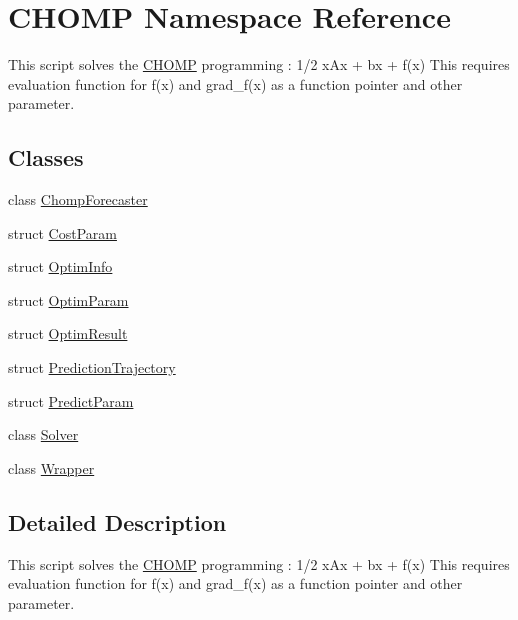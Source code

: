 \hypertarget{namespace_c_h_o_m_p}{}\section{C\+H\+O\+MP Namespace Reference}
\label{namespace_c_h_o_m_p}


This script solves the \hyperlink{namespace_c_h_o_m_p}{C\+H\+O\+MP} programming \+: 1/2 x\textquotesingle{}Ax + bx + f(x) This requires evaluation function for f(x) and grad\+\_\+f(x) as a function pointer and other parameter.  


\subsection*{Classes}
\begin{DoxyCompactItemize}
\item 
class \hyperlink{class_c_h_o_m_p_1_1_chomp_forecaster}{Chomp\+Forecaster}
\item 
struct \hyperlink{struct_c_h_o_m_p_1_1_cost_param}{Cost\+Param}
\item 
struct \hyperlink{struct_c_h_o_m_p_1_1_optim_info}{Optim\+Info}
\item 
struct \hyperlink{struct_c_h_o_m_p_1_1_optim_param}{Optim\+Param}
\item 
struct \hyperlink{struct_c_h_o_m_p_1_1_optim_result}{Optim\+Result}
\item 
struct \hyperlink{struct_c_h_o_m_p_1_1_prediction_trajectory}{Prediction\+Trajectory}
\item 
struct \hyperlink{struct_c_h_o_m_p_1_1_predict_param}{Predict\+Param}
\item 
class \hyperlink{class_c_h_o_m_p_1_1_solver}{Solver}
\item 
class \hyperlink{class_c_h_o_m_p_1_1_wrapper}{Wrapper}
\end{DoxyCompactItemize}


\subsection{Detailed Description}
This script solves the \hyperlink{namespace_c_h_o_m_p}{C\+H\+O\+MP} programming \+: 1/2 x\textquotesingle{}Ax + bx + f(x) This requires evaluation function for f(x) and grad\+\_\+f(x) as a function pointer and other parameter. 
